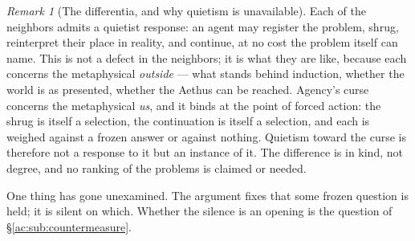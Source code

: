 \documentclass[11pt]{article}
\numberwithin{equation}{section}
\theoremstyle{plain}
\theoremstyle{definition}
\theoremstyle{remark}
\newtheorem{remark}[theorem]{Remark}
\begin{document}
\begin{remark}[The differentia, and why quietism is unavailable]\label{ac:rem:differentia}
Each of the neighbors admits a quietist response: an agent may register the problem, shrug, reinterpret their place in reality, and continue, at no cost the problem itself can name. This is not a defect in the neighbors; it is what they are like, because each concerns the metaphysical \emph{outside} --- what stands behind induction, whether the world is as presented, whether the Aethus can be reached. Agency's curse concerns the metaphysical \emph{us}, and it binds at the point of forced action: the shrug is itself a selection, the continuation is itself a selection, and each is weighed against a frozen answer or against nothing. Quietism toward the curse is therefore not a response to it but an instance of it. The difference is in kind, not degree, and no ranking of the problems is claimed or needed.
\end{remark}

One thing has gone unexamined. The argument fixes that some frozen question is held; it is silent on which. Whether the silence is an opening is the question of \S\ref{ac:sub:countermeasure}.
\end{document}
